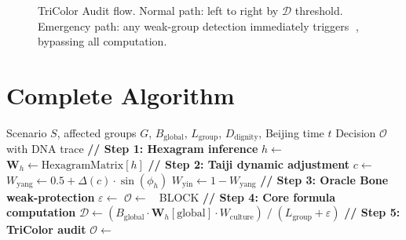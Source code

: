 \documentclass[conference]{IEEEtran}
\newcommand{\LH}{\textcolor{dragonRed}{\textbf{龍魂}}}
\begin{document}
\begin{figure}[t]
\centering
{}
\caption{TriColor Audit flow.
  Normal path: left to right by $\mathcal{D}$ threshold.
  Emergency path: any weak-group detection immediately
  triggers 🔴, bypassing all computation.}
\label{fig:tricolor}
\end{figure}

\section{Complete Algorithm}
\label{sec:algorithm}

\begin{algorithm}[t]
\caption{\LH{} Dynamic Weight Decision Algorithm v2.0}
\label{alg:main}
\begin{algorithmic}[1]
\Require Scenario $S$, affected groups $G$,
  $B_{\text{global}}$, $L_{\text{group}}$,
  $D_{\text{dignity}}$, Beijing time $t$
\Ensure Decision $\mathcal{O}$ with DNA trace
\State \textbf{// Step 1: Hexagram inference}
\State $h \gets$ 
\State $\mathbf{W}_h \gets \text{HexagramMatrix}[h]$
\State \textbf{// Step 2: Taiji dynamic adjustment}
\State $c \gets$ 
\State $W_{\text{yang}} \gets 0.5
  + \Delta(c)\cdot\sin(\phi_h)$
\State $W_{\text{yin}}  \gets 1 - W_{\text{yang}}$
\State \textbf{// Step 3: Oracle Bone weak-protection}
\State $\varepsilon \gets$
\If{$\varepsilon = +\infty$}
  \State $\mathcal{O} \gets$ 🔴 BLOCK
  \State \Return {}
\EndIf
\State \textbf{// Step 4: Core formula computation}
\State $\mathcal{D} \gets
  (B_{\text{global}} \cdot \mathbf{W}_h[\text{global}]
   \cdot W_{\text{culture}})
  \;/\;
  (L_{\text{group}} + \varepsilon)$
\State \textbf{// Step 5: TriColor audit}
\State $\mathcal{O} \gets$
\State \Return {}
\end{algorithmic}
\end{algorithm}
\end{document}

